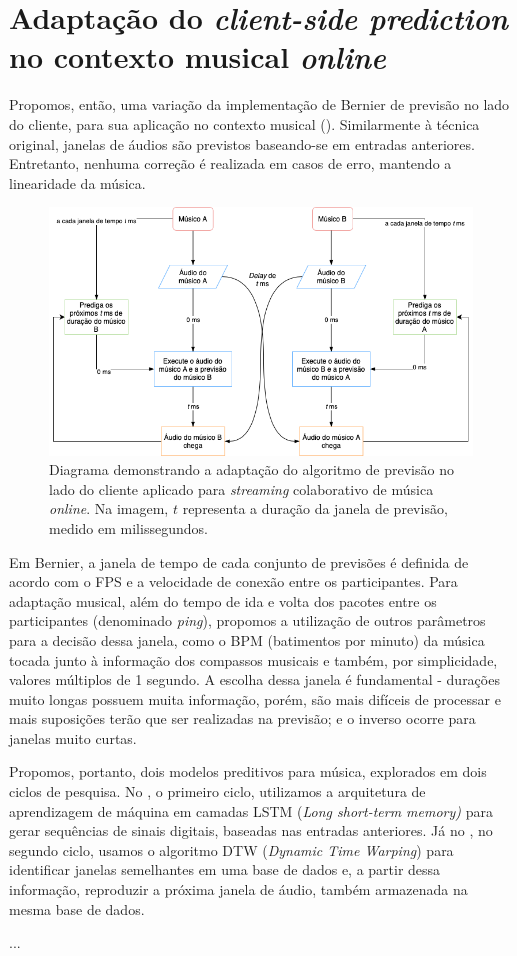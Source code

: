 \section{Adaptação do \textit{client-side prediction} no contexto musical \textit{online}}

Propomos, então, uma variação da implementação de Bernier \cite{client-side-prediction} de previsão no lado do cliente, para sua aplicação no contexto musical (). Similarmente à técnica original, janelas de áudios são previstos baseando-se em entradas anteriores. Entretanto, nenhuma correção é realizada em casos de erro, mantendo a linearidade da música.

\begin{figure}[htbp]
\centering
\includegraphics[width=1\textwidth]{images/rollback-music.png}
\caption{Diagrama demonstrando a adaptação do algoritmo de previsão no lado do cliente aplicado para \textit{streaming} colaborativo de música \textit{online}. Na imagem, $t$ representa a duração da janela de previsão, medido em milissegundos.}
\label{fig:rollback_music_diagram}
\end{figure}

Em Bernier, a janela de tempo de cada conjunto de previsões é definida de acordo com o FPS e a velocidade de conexão entre os participantes. Para adaptação musical, além do tempo de ida e volta dos pacotes entre os participantes (denominado \textit{ping}), propomos a utilização de outros parâmetros para a decisão dessa janela, como o BPM (batimentos por minuto) da música tocada junto à informação dos compassos musicais e também, por simplicidade, valores múltiplos de 1 segundo. A escolha dessa janela é fundamental - durações muito longas possuem muita informação, porém, são mais difíceis de processar e mais suposições terão que ser realizadas na previsão; e o inverso ocorre para janelas muito curtas.

Propomos, portanto, dois modelos preditivos para música, explorados em dois ciclos de pesquisa. No , o primeiro ciclo, utilizamos a arquitetura de aprendizagem de máquina em camadas LSTM (\textit{Long short-term memory)} \cite{lstm} para gerar sequências de sinais digitais, baseadas nas entradas anteriores. Já no , no segundo ciclo, usamos o algoritmo DTW (\textit{Dynamic Time Warping}) \cite{dtw} para identificar janelas semelhantes em uma base de dados e, a partir dessa informação, reproduzir a próxima janela de áudio, também armazenada na mesma base de dados.

...
